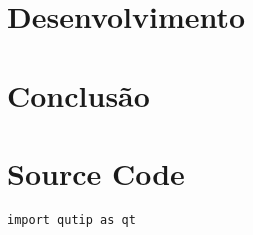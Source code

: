 \documentclass[a4paper,pra,aps,twocolumn,superscriptaddress,10pt]{revtex4-2}
\begin{document}
\section{Desenvolvimento}
    \lipsum[2-4]


\section{Conclusão}
    \lipsum[2-4]

% 


\appendix

\section{Source Code}
\label{apx:code}

\begin{lstlisting}[style=python,gobble=4,caption={Quick example of importing}]
        import qutip as qt
\end{lstlisting}
\end{document}
